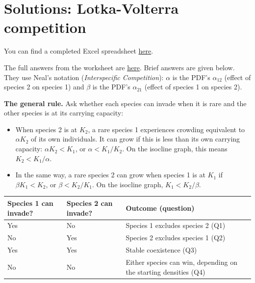\documentclass[
  a4paper]{book}
\newcounter{none} %
\providecommand{\tightlist}{%
  \setlength{\itemsep}{0pt}\setlength{\parskip}{0pt}}
\begin{document}
\section{Solutions: Lotka-Volterra competition}\label{solutions-lotka-volterra-competition}

You can find a completed Excel spreadsheet \href{https://www.dropbox.com/s/q1qoqxhnm82uugw/9.\%20LV\%20Competition.xlsx?dl=1}{here}.

The full answers from the worksheet are \href{https://www.dropbox.com/s/oz2c10bmyf8t7s6/9.\%20Answers\%20to\%20questions.pdf?dl=1}{here}. Brief answers are given below. They use Neal's notation (\emph{Interspecific Competition}): \(\alpha\) is the PDF's \(\alpha_{12}\) (effect of species 2 on species 1) and \(\beta\) is the PDF's \(\alpha_{21}\) (effect of species 1 on species 2).

\textbf{The general rule.} Ask whether each species can invade when it is rare and the other species is at its carrying capacity:

\begin{itemize}
\tightlist
\item
  When species 2 is at \(K_2\), a rare species 1 experiences crowding equivalent to \(\alpha K_2\) of its own individuals. It can grow if this is less than its own carrying capacity: \(\alpha K_2 < K_1\), or \(\alpha < K_1/K_2\). On the isocline graph, this means \(K_2 < K_1/\alpha\).
\item
  In the same way, a rare species 2 can grow when species 1 is at \(K_1\) if \(\beta K_1 < K_2\), or \(\beta < K_2/K_1\). On the isocline graph, \(K_1 < K_2/\beta\).
\end{itemize}

{\def\LTcaptype{none} %
\begin{longtable}[]{@{}
  >{\raggedright\arraybackslash}p{}
  >{\raggedright\arraybackslash}p{}
  >{\raggedright\arraybackslash}p{}@{}}
\toprule\noalign{}
\begin{minipage}[b]{\linewidth}\raggedright
Species 1 can invade?
\end{minipage} & \begin{minipage}[b]{\linewidth}\raggedright
Species 2 can invade?
\end{minipage} & \begin{minipage}[b]{\linewidth}\raggedright
Outcome (question)
\end{minipage} \\
\midrule\noalign{}
\endhead
\bottomrule\noalign{}
\endlastfoot
Yes & No & Species 1 excludes species 2 (Q1) \\
No & Yes & Species 2 excludes species 1 (Q2) \\
Yes & Yes & Stable coexistence (Q3) \\
No & No & Either species can win, depending on the starting densities (Q4) \\
\end{longtable}
}
\end{document}
